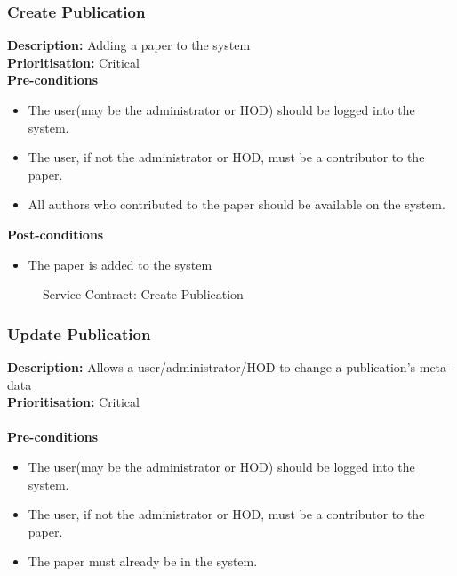 \documentclass[a4paper]{article}
\begin{document}
	\subsubsection{Create Publication}
	
	\textbf{Description:} Adding a paper to the system\\
	\textbf{Prioritisation:} Critical\\
	
	
	\textbf{Pre-conditions}
	\begin{itemize}
		\item The user(may be the administrator or HOD) should be logged into the system.
		\item The user, if not the administrator or HOD, must be a contributor to the paper.
		\item All authors who contributed to the paper should be available on the system.
	\end{itemize}
	
	\textbf{Post-conditions}
	\begin{itemize}
		\item The paper is added to the system
	\end{itemize}
	
	\begin{figure}[H]
		\centering
		\caption{Service Contract: Create Publication}
	\end{figure}
	\pagebreak
	\subsubsection{Update Publication}
	
	\textbf{Description:} Allows a user/administrator/HOD to change a publication's meta-data\\
	\textbf{Prioritisation:} Critical\\
	\\
	
	\textbf{Pre-conditions}
	\begin{itemize}
		\item The user(may be the administrator or HOD) should be logged into the system.
		\item The user, if not the administrator or HOD, must be a contributor to the paper.
		\item The paper must already be in the system.
	\end{itemize}
	
\end{document}

